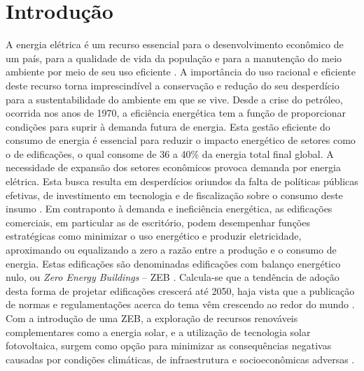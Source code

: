 \section{Introdução}
\begin{onehalfspace}
A energia elétrica é um recurso essencial para o desenvolvimento econômico de um país, para a qualidade de vida  da população e para a manutenção do meio ambiente por meio de seu uso eficiente \cite{Fonseca2016}. A importância do uso racional e eficiente deste recurso torna imprescindível a conservação e redução do seu desperdício para a sustentabilidade do ambiente em que se vive.\vspace*{0.3cm} \newline
Desde a crise do petróleo, ocorrida nos anos de 1970, a eficiência energética tem a função de proporcionar condições para suprir à demanda futura de energia. Esta gestão eficiente do consumo de energia é essencial para reduzir o impacto energético de setores como o de edificações, o qual consome de 36 a 40\% da energia total final global. A necessidade de expansão dos setores econômicos provoca demanda por energia elétrica. Esta busca resulta em desperdícios oriundos da falta de políticas públicas efetivas, de investimento em tecnologia e de fiscalização sobre o consumo deste insumo \cite{InternationalEnergyAgency-IEA2019,InternationalEnergyAgency-IEA2019a, UnitedNationsEnvironmentProgramme-UNEP2019,UnitedNations2017}.\vspace*{0.3cm} \newline
Em contraponto à demanda e ineficiência energética, as edificações comerciais, em particular as de escritório, podem desempenhar funções estratégicas como minimizar o uso energético e produzir eletricidade, aproximando ou equalizando a zero a razão entre a produção e o consumo de energia. Estas edificações são denominadas edificações com balanço energético nulo, ou \textit{Zero Energy Buildings} – ZEB \cite{Crawley2009,Torcellini2006,Kurnitski2011,Kurnitski2011a,Torcellini2015}.\vspace*{0.3cm} \newline
Calcula-se que a tendência de adoção desta forma de projetar edificações crescerá até 2050, haja vista que a publicação de normas e regulamentações acerca do tema vêm crescendo ao redor do mundo \cite{UnitedNationsEnvironmentProgramme-UNEP2019}. Com a introdução de uma ZEB, a exploração de recursos renováveis complementares como a energia solar, e a utilização de tecnologia solar fotovoltaica, surgem como opção para minimizar as consequências negativas causadas por condições climáticas, de infraestrutura e socioeconômicas adversas \cite{Pikas2014,Pikas2017}.\vspace*{0.3cm} \newline

\end{onehalfspace}

